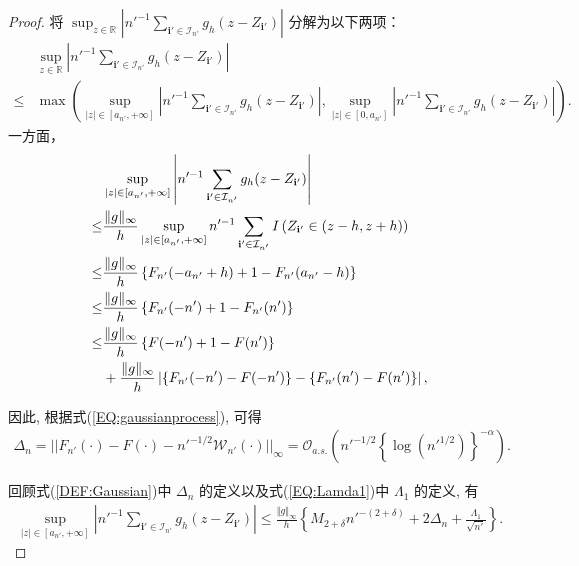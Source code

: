 \documentclass[a4paper,openay,14pt]{ctexbook}
\numberwithin{equation}{section}
\numberwithin{lem}{section}
\begin{document}
\begin{proof}
将 $\sup_{z\in\mathbb{R}}\left\vert n'^{-1}\sum_{\mathbf{i}' \in\mathcal{I}_{n'}}g_h(z-Z_{\mathbf{i}'})\right\vert$ 分解为以下两项：
\begin{align*}
    &\sup_{z\in\mathbb{R}}\left\vert n'^{-1}\sum_{\mathbf{i}' \in\mathcal{I}_{n'}}g_h(z-Z_{\mathbf{i}'})\right\vert\\
    \leq& \max\left(\sup_{\vert z\vert\in\left[a_{n'},+\infty\right]}\left\vert n'^{-1}\sum_{\mathbf{i}'\in\mathcal{I}_{n'}}g_h(z-Z_{\mathbf{i}'})\right\vert, \sup_{\vert z\vert\in\left[0,a_{n'}\right]}\left\vert n'^{-1}\sum_{\mathbf{i}'\in\mathcal{I}_{n'}}g_h(z-Z_{\mathbf{i}'})\right\vert\right).
\end{align*}
一方面，
\begin{align*}
    &\sup_{\vert z\vert\in\left[a_{n'},+\infty\right]}\left\vert n'^{-1}\sum_{\mathbf{i}'\in\mathcal{I}_{n'}}g_h(z-Z_{\mathbf{i}'})\right\vert  \\
    \leq &\frac{\Vert g\Vert_{\infty}}{h}\sup_{\vert z\vert\in\left[a_{n'},+\infty\right]}n'^{-1}\sum_{\mathbf{i}'\in\mathcal{I}_{n'}}I\left(Z_{\mathbf{i}'}\in(z-h,z+h)\right)\\
    \leq &\frac{\Vert g\Vert_{\infty}}{h}\left\{F_{n'}(-a_{n'}+h)+1-F_{n'}(a_{n'}-h)\right\} \notag\\
    \leq &\frac{\Vert g\Vert_{\infty}}{h}\left\{F_{n'}(-n')+1-F_{n'}(n')\right\} \\
    \leq &\frac{\Vert g\Vert_{\infty}}{h}\left\{F(-n')+1-F(n')\right\} \\
    & + \frac{\Vert g\Vert_{\infty}}{h}\left\vert\left\{F_{n'}(-n')-F(-n')\right \}-\left \{F_{n'}(n')-F(n')\right\} \right\vert,
\end{align*}

因此, 根据式(\ref{EQ:gaussianprocess}), 可得
\begin{equation}
\begin{aligned} \label{DEF:Gaussian}
\Delta_n
=||F_{n'}(\cdot)-F(\cdot)-n'^{-1/2}\mathcal{W}_{n'}(\cdot)||_{\infty}
=\mathcal{O}_{a.s.}\left(n'^{-1/2}\left\{\log (n'^{1/2})\right\}^{-\alpha}\right).
\end{aligned}
\end{equation}

回顾式(\ref{DEF:Gaussian})中 $\Delta_n$ 的定义以及式(\ref{EQ:Lamda1})中 $\Lambda_1$ 的定义, 有
\begin{align} \label{EQ:Situ1}
\sup_{\vert z\vert\in\left[a_{n'},+\infty\right]}
\left\vert n'^{-1}\sum_{\mathbf{i}'\in\mathcal{I}_{n'}}g_h(z-Z_{\mathbf{i}'})\right\vert
\leq
\frac{\Vert g\Vert_{\infty}}{h}
\left\{M_{2+\delta}n'^{-(2+\delta)} + 2\Delta_n + \frac{\Lambda_1}{\sqrt{n'}}\right\}.
\end{align}


\end{proof}
\end{document}
